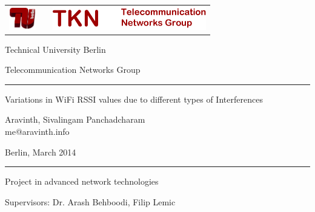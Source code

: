 \documentclass[11pt,a4paper,headinclude,footinclude,chapterprefix=on]{scrreprt}
\makeatletter
\newcommand{\trdate}{March 2014}
\newcommand{\trauthor}{Aravinth, Sivalingam Panchadcharam}
\newcommand{\tremail}{me@aravinth.info}
\newcommand{\trtitle}{Variations in WiFi RSSI values due to different types of Interferences}
\makeatother
\begin{document}
 


{ \sffamily

\thispagestyle{empty} 
\begin{tabularx}
	{\columnwidth}{cXc} 
	\includegraphics[height=1cm]{Images/TU-Logo-3D-rot.pdf} & & 
	\includegraphics[height=1cm]{Images/tknlogo.pdf} \\
\end{tabularx}

\vspace{1.0cm} 
\begin{center}
	{\huge 
	\noindent Technical University Berlin
	
	\vspace{0.5cm}
	
	\noindent Telecommunication Networks Group 
	\begin{center}
		\rule{15.5cm}{0.4pt} 
	\end{center}
	} 
\end{center}
\begin{minipage}
	[][11.0cm][c]{14.5cm} {\Huge 
	\begin{center}
		\trtitle 
	\end{center}
	\begin{center}
		\trauthor \\
		{\Large \tremail} 
	\end{center}
	\begin{center}
		Berlin, \trdate 
	\end{center}
	
	\vspace{0.5cm}
	
	} 
\end{minipage}

\setlength{\fboxrule}{0.4pt} \setlength{\fboxsep}{0.4pt} 
\begin{center}
	
	\rule{15.5cm}{0.4pt}
	
	\vspace{0.5cm}
	
	{\huge {Project in advanced network technologies}}
	
	\vspace{0.5cm}
	
	{\huge Supervisors: Dr. Arash Behboodi, Filip Lemic}
	
	\vspace{0.5cm} 
\end{center}
}
\end{document}
